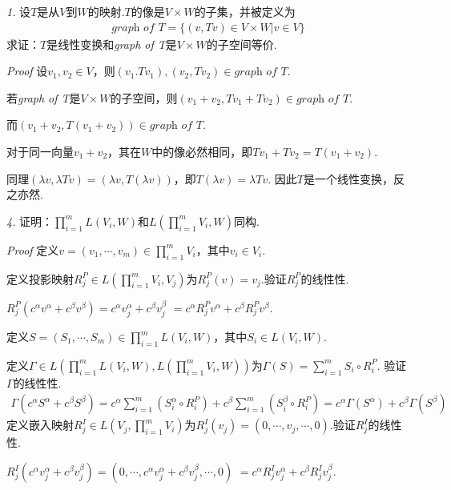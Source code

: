 \textit{1.}
设\(T\)是从\(V\)到\(W\)的映射.\(T\)的像是\(V \times W\)的子集，并被定义为
    \begin{align*}
        \textit{graph of T}= \{(v,Tv) \in V \times W |v \in V\}
    \end{align*}
求证：\(T\)是线性变换和\textit{graph of T}是\(V \times W\)的子空间等价.

\textit{Proof}
设\(v_1,v_2 \in V\)，则\((v_1.Tv_1),(v_2,Tv_2) \in \textit{graph of T}\).

若\textit{graph of T}是\(V \times W\)的子空间，则\((v_1+v_2,Tv_1+Tv_2) \in \textit{graph of T}\).

而\((v_1+v_2,T(v_1+v_2)) \in \textit{graph of T}\).

对于同一向量\(v_1+v_2\)，其在\(W\)中的像必然相同，即\(Tv_1+Tv_2=T(v_1+v_2)\).

同理\((\lambda v,\lambda Tv)=(\lambda v,T(\lambda v))\)，即\(T(\lambda v)=\lambda Tv\).
因此\(T\)是一个线性变换，反之亦然.

\hspace*{\fill}

\textit{4.}
证明：\(\prod_{i=1}^m L(V_i,W)\)和\(L(\prod_{i=1}^m V_i,W)\)同构.

\textit{Proof}
定义\(v=(v_1,\cdots,v_m) \in \prod_{i=1}^m V_i\)，其中\(v_i \in V_i\).

定义投影映射\(R_j^P \in L(\prod_{i=1}^m V_i,V_j)\)为\(R_j^P(v)=v_j\).验证\(R_j^P\)的线性性.

\(R_j^P(c^\alpha v^\alpha+c^\beta v^\beta)=c^\alpha v_j^\alpha+c^\beta v_j^\beta\)
\(=c^\alpha R_j^P v^\alpha+c^\beta R_j^P v^\beta\).

定义\(S=(S_1,\cdots,S_m) \in \prod_{i=1}^m L(V_i,W)\)，其中\(S_i \in L(V_i,W)\).

定义\(\Gamma \in L(\prod_{i=1}^m L(V_i,W),L(\prod_{i=1}^m V_i,W))\)为\(\Gamma(S)=\sum_{i=1}^m S_i \circ R_i^P\).
验证\(\Gamma\)的线性性.
    \begin{align*}
        \Gamma(c^\alpha S^\alpha+c^\beta S^\beta)
        =c^\alpha \sum_{i=1}^m(S_i^\alpha \circ R_i^P)+c^\beta \sum_{i=1}^m(S_i^\beta \circ R_i^P)
        =c^\alpha \Gamma(S^\alpha)+c^\beta \Gamma(S^\beta)
    \end{align*}
定义嵌入映射\(R_j^I \in L(V_j,\prod_{i=1}^m V_i)\)为\(R_j^I(v_j)=(0,\cdots,v_j,\cdots,0)\).验证\(R_j^I\)的线性性.

\(R_j^I(c^\alpha v_j^\alpha+c^\beta v_j^\beta)=(0,\cdots,c^\alpha v_j^\alpha+c^\beta v_j^\beta,\cdots,0)\)
\(=c^\alpha R_j^I v_j^\alpha+c^\beta R_j^I v_j^\beta\).

